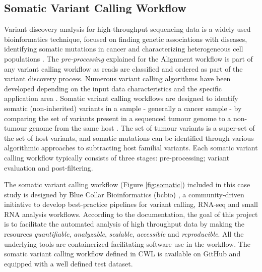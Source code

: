\documentclass[a4paper,num-refs]{oup-contemporary}
\begin{document}
\subsection{Somatic Variant Calling Workflow}
Variant discovery analysis for high-throughput sequencing data is a widely used bioinformatics technique, focused on finding genetic associations with diseases, identifying somatic mutations in cancer and characterizing heterogeneous cell populations \citep{variantcallinglecture}. The \textit{pre-processing} explained for the Alignment workflow is part of any variant calling workflow as reads are classified and ordered as part of the variant discovery process. Numerous variant calling algorithms have been developed depending on the input data characteristics and the specific application area \citep{xu2018review}. Somatic variant calling workflows are designed to identify somatic (non-inherited) variants in a sample - generally a cancer sample - by comparing the set of variants present in a sequenced tumour genome to a non-tumour genome from the same host \citep{Saunders2012}. The set of tumour variants is a super-set of the set of host variants, and somatic mutations can be identified through various algorithmic approaches to subtracting host familial variants. Each somatic variant calling workflow typically consists of three stages: pre-processing; variant evaluation and post-filtering.
 
The somatic variant calling workflow (Figure \ref{fig:somatic}) included in this case study is designed by Blue Collar Bioinformatics (bcbio) \citep{bcbio}, a community-driven initiative to develop best-practice pipelines for variant calling, RNA-seq and small RNA analysis workflows. According to the documentation, the goal of this project is to facilitate the automated analysis of high throughput data by making the resources \textit{quantifiable}, \textit{analyzable}, \textit{scalable}, \textit{accessible} and \textit{reproducible}. All the underlying tools are containerized facilitating software use in the workflow. The somatic variant calling workflow defined in CWL is available on GitHub \citep{bcbiowf} and equipped with a well defined test dataset. 
 
\end{document}
